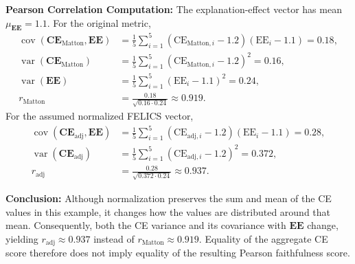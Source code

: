 \begin{example_box}[label=ex:payout_normalization_correlation]
    \smallskip
    \textbf{Pearson Correlation Computation:} The explanation-effect vector has mean $\mu_{\mathbf{EE}}=1.1$. For the original metric,
    \begin{align}
        \operatorname{cov}(\mathbf{CE}_{\mathrm{Matton}}, \mathbf{EE}) & = \frac{1}{5}\sum_{i=1}^5 (\mathrm{CE}_{\mathrm{Matton},i} - 1.2)(\mathrm{EE}_i - 1.1) = 0.18, \\
        \operatorname{var}(\mathbf{CE}_{\mathrm{Matton}})              & = \frac{1}{5}\sum_{i=1}^5 (\mathrm{CE}_{\mathrm{Matton},i} - 1.2)^2 = 0.16, \\
        \operatorname{var}(\mathbf{EE})                                 & = \frac{1}{5}\sum_{i=1}^5 (\mathrm{EE}_i - 1.1)^2 = 0.24, \\
        r_{\mathrm{Matton}}                                  & = \frac{0.18}{\sqrt{0.16 \cdot 0.24}} \approx 0.919.
    \end{align}
    For the assumed normalized FELICS vector,
    \begin{align}
        \operatorname{cov}(\mathbf{CE}_{\mathrm{adj}}, \mathbf{EE}) & = \frac{1}{5}\sum_{i=1}^5 (\mathrm{CE}_{\mathrm{adj},i} - 1.2)(\mathrm{EE}_i - 1.1) = 0.28, \\
        \operatorname{var}(\mathbf{CE}_{\mathrm{adj}})              & = \frac{1}{5}\sum_{i=1}^5 (\mathrm{CE}_{\mathrm{adj},i} - 1.2)^2 = 0.372, \\
        r_{\mathrm{adj}}                                 & = \frac{0.28}{\sqrt{0.372 \cdot 0.24}} \approx 0.937.
    \end{align}

    \smallskip
    \textbf{Conclusion:} Although normalization preserves the sum and mean of the CE values in this example, it changes how the values are distributed around that mean. Consequently, both the CE variance and its covariance with $\mathbf{EE}$ change, yielding $r_{\mathrm{adj}}\approx0.937$ instead of $r_{\mathrm{Matton}}\approx0.919$. Equality of the aggregate CE score therefore does not imply equality of the resulting Pearson faithfulness score.
\end{example_box}

